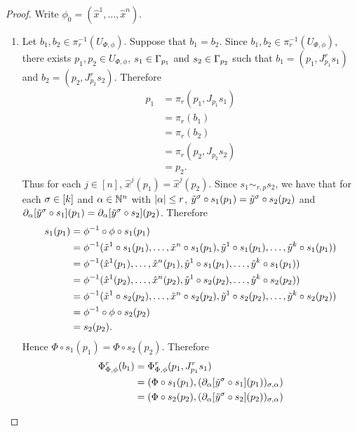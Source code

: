 \documentclass{book}
\begin{document}
\begin{proof}
	Write $\phi_0 = (\hat{x}^1, \ldots, \hat{x}^n)$. 
	\begin{enumerate}
		\item Let $b_1, b_2 \in \pi_r^{-1}(U_{\Phi, \phi})$. Suppose that $b_1 = b_2$. Since $b_1, b_2 \in \pi_r^{-1}(U_{\Phi, \phi})$, there exists $p_1, p_2 \in U_{\Phi, \phi}$, $s_1 \in \Gamma_{p_1}$ and $s_2 \in \Gamma_{p_2}$ such that $b_1 = (p_1, J^r_{p_1} s_1)$ and $b_2 = (p_2, J^r_{p_2} s_2)$. Therefore 
		\begin{align*}
			p_1
			& = \pi_r(p_1, J_{p_1} s_1) \\ 
			& = \pi_r(b_1) \\
			& = \pi_r(b_2) \\
			& = \pi_r(p_2, J_{p_2} s_2) \\
			& = p_2. 
		\end{align*}
		Thus for each $j \in [n]$, $\hat{x}^j(p_1) = \hat{x}^j(p_2)$. Since $s_1 {\sim_{r, p}} s_2$, we have that for each $\sigma \in [k]$ and $\alpha \in \mathbb{N}^n$ with $|\alpha| \leq r$, 
		$\tilde{y}^{\sigma} \circ s_1(p_1) = \tilde{y}^{\sigma} \circ s_2(p_2)$ and $\partial_{\alpha} [\tilde{y}^{\sigma} \circ s_1](p_1) = \partial_{\alpha} [\tilde{y}^{\sigma} \circ s_2](p_2)$. Therefore 
		\begin{align*}
			s_1(p_1)
			& = \phi^{-1} \circ \phi \circ s_1(p_1) \\
			& = \phi^{-1}(\tilde{x}^1 \circ s_1(p_1), \ldots, \tilde{x}^n \circ s_1(p_1), \tilde{y}^1 \circ s_1(p_1), \ldots, \tilde{y}^k \circ s_1(p_1)) \\
			& = \phi^{-1}(\hat{x}^1(p_1), \ldots, \hat{x}^n(p_1), \tilde{y}^1 \circ s_1(p_1), \ldots, \tilde{y}^k \circ s_1(p_1)) \\
			& = \phi^{-1}(\hat{x}^1(p_2), \ldots, \hat{x}^n(p_2), \tilde{y}^1 \circ s_2(p_2), \ldots, \tilde{y}^k \circ s_2(p_2)) \\
			& = \phi^{-1}(\tilde{x}^1 \circ s_2 (p_2), \ldots, \tilde{x}^n \circ s_2(p_2), \tilde{y}^1 \circ s_2(p_2), \ldots, \tilde{y}^k \circ s_2(p_2)) \\
			& = \phi^{-1} \circ \phi \circ s_2(p_2) \\
			& = s_2(p_2).
		\end{align*}
		Hence $\Phi \circ s_1(p_1) = \Phi \circ s_2(p_2)$. Therefore
		\begin{align*}
			\Phi^r_{\Phi, \phi}(b_1)
			& = \Phi^r_{\Phi, \phi}(p_1, J^r_{p_1}s_1) \\
			& = (\Phi \circ s_1(p_1), (\p_{\al}[\tl{y}^{\sig} \circ s_1](p_1))_{\sig, \al}) \\
			& = (\Phi \circ s_2(p_2), (\p_{\al}[\tl{y}^{\sig} \circ s_2](p_2))_{\sig, \al}) \\

\end{align*}
\end{enumerate}
\end{proof}
\end{document}
